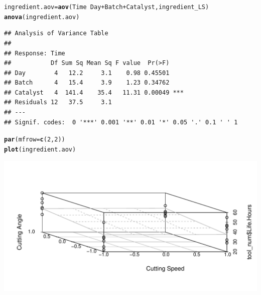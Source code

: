 \documentclass[a4paper]{article}\usepackage{graphicx, color}
\makeatletter
\def\maxwidth{ %
  \ifdim\Gin@nat@width>\linewidth
    \linewidth
  \else
    \Gin@nat@width
  \fi
}
\newcommand{\hlfunctioncall}[1]{\textcolor[rgb]{0.501960784313725,0,0.329411764705882}{\textbf{#1}}}%
\newenvironment{kframe}{%
 \def\at@end@of@kframe{}%
 \ifinner\ifhmode%
  \def\at@end@of@kframe{\end{minipage}}%
  \begin{minipage}{\columnwidth}%
 \fi\fi%
 \def\FrameCommand##1{\hskip\@totalleftmargin \hskip-\fboxsep
 \colorbox{shadecolor}{##1}\hskip-\fboxsep
     \hskip-\linewidth \hskip-\@totalleftmargin \hskip\columnwidth}%
 \MakeFramed {\advance\hsize-\width
   \@totalleftmargin\z@ \linewidth\hsize
   \@setminipage}}%
 {\par\unskip\endMakeFramed%
 \at@end@of@kframe}
\newenvironment{knitrout}{}{} %
\makeatother
\begin{document}
\begin{knitrout}
\begin{kframe}
\begin{alltt}
ingredient.aov = \hlfunctioncall{aov}(Time ~ Day + Batch + Catalyst, ingredient_LS)
\hlfunctioncall{anova}(ingredient.aov)
\end{alltt}
\begin{verbatim}
## Analysis of Variance Table
## 
## Response: Time
##           Df Sum Sq Mean Sq F value  Pr(>F)    
## Day        4   12.2     3.1    0.98 0.45501    
## Batch      4   15.4     3.9    1.23 0.34762    
## Catalyst   4  141.4    35.4   11.31 0.00049 ***
## Residuals 12   37.5     3.1                    
## ---
## Signif. codes:  0 '***' 0.001 '**' 0.01 '*' 0.05 '.' 0.1 ' ' 1
\end{verbatim}
\begin{alltt}
\hlfunctioncall{par}(mfrow = \hlfunctioncall{c}(2, 2))
\hlfunctioncall{plot}(ingredient.aov)
\end{alltt}
\end{kframe}
\includegraphics[width=\maxwidth]{figure/unnamed-chunk-7} 

\end{knitrout}
\end{document}
